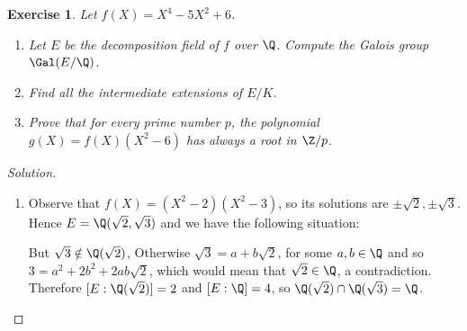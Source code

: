 \documentclass[a4paper,10pt,reqno]{amsart}
\newtheorem{ex}{Exercise}[section]
\newenvironment{sol}
  {\renewcommand\qedsymbol{$\blacksquare$}\begin{proof}[Solution]}
  {\end{proof}}
\begin{document}
\begin{ex}
\label{10.1}
    Let $f(X)=X^4-5X^2+6$.
    \begin{enumerate}[label=(\roman*)]
        \item Let $E$ be the decomposition field of $f$ over $\Q$.
        Compute the Galois group $\Gal(E/\Q)$.
        \item Find all the intermediate extensions of $E/K$.
        \item Prove that for every prime number $p$,
        the polynomial $g(X)=f(X)(X^2-6)$ has always 
        a root in $\Z/p$.                
    \end{enumerate}
\end{ex}
\begin{sol}~
    \begin{enumerate}[label=(\roman*)]
    \item Observe that $f(X)=(X^2-2)(X^2-3)$,
    so its solutions are $\pm \sqrt{2},\pm\sqrt{3}$.
    Hence $E=\Q(\sqrt{2},\sqrt{3})$ 
    and we have the following situation:

\hspace{-2cm}
    \begin{minipage}[c]{0.57\textwidth}
    \end{minipage}
    \begin{minipage}[l]{0.4\textwidth}
        But $\sqrt{3}\notin \Q(\sqrt{2})$,
        Otherwise $\sqrt{3}=a+b\sqrt{2}$,
        for some $a,b\in\Q$ and so
        $3=a^2+2b^2+2ab\sqrt{2}$,
        which would mean that $\sqrt{2}\in\Q$,
        a contradiction.
        Therefore $[E:\Q(\sqrt{2})]=2$ and 
        $[E:\Q]=4$, so
$\Q(\sqrt{2})\cap\Q(\sqrt{3})=\Q$.
    \end{minipage}


\end{enumerate}
\end{sol}
\end{document}
